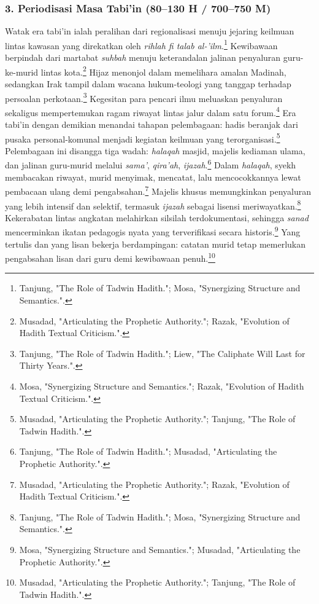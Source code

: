 \subsubsection*{3. Periodisasi Masa Tabi'in (80--130 H / 700--750 M)}

Watak era tabi'in ialah peralihan dari regionalisasi menuju jejaring keilmuan lintas kawasan yang direkatkan oleh \textit{rihlah fi talab al-'ilm}.\footnote{Tanjung, "The Role of Tadwin Hadith."; Mosa, "Synergizing Structure and Semantics.".} Kewibawaan berpindah dari martabat \textit{suhbah} menuju keterandalan jalinan penyaluran guru-ke-murid lintas kota.\footnote{Musadad, "Articulating the Prophetic Authority."; Razak, "Evolution of Hadith Textual Criticism.".} Hijaz menonjol dalam memelihara amalan Madinah, sedangkan Irak tampil dalam wacana hukum-teologi yang tanggap terhadap persoalan perkotaan.\footnote{Tanjung, "The Role of Tadwin Hadith."; Liew, "The Caliphate Will Last for Thirty Years.".} Kegesitan para pencari ilmu meluaskan penyaluran sekaligus mempertemukan ragam riwayat lintas jalur dalam satu forum.\footnote{Mosa, "Synergizing Structure and Semantics."; Razak, "Evolution of Hadith Textual Criticism.".} Era tabi'in dengan demikian menandai tahapan pelembagaan: hadis beranjak dari pusaka personal-komunal menjadi kegiatan keilmuan yang terorganisasi.\footnote{Musadad, "Articulating the Prophetic Authority."; Tanjung, "The Role of Tadwin Hadith.".} Pelembagaan ini disangga tiga wadah: \textit{halaqah} masjid, majelis kediaman ulama, dan jalinan guru-murid melalui \textit{sama'}, \textit{qira'ah}, \textit{ijazah}.\footnote{Tanjung, "The Role of Tadwin Hadith."; Musadad, "Articulating the Prophetic Authority.".} Dalam \textit{halaqah}, syekh membacakan riwayat, murid menyimak, mencatat, lalu mencocokkannya lewat pembacaan ulang demi pengabsahan.\footnote{Musadad, "Articulating the Prophetic Authority."; Razak, "Evolution of Hadith Textual Criticism.".} Majelis khusus memungkinkan penyaluran yang lebih intensif dan selektif, termasuk \textit{ijazah} sebagai lisensi meriwayatkan.\footnote{Tanjung, "The Role of Tadwin Hadith."; Mosa, "Synergizing Structure and Semantics.".} Kekerabatan lintas angkatan melahirkan silsilah terdokumentasi, sehingga \textit{sanad} mencerminkan ikatan pedagogis nyata yang terverifikasi secara historis.\footnote{Mosa, "Synergizing Structure and Semantics."; Musadad, "Articulating the Prophetic Authority.".} Yang tertulis dan yang lisan bekerja berdampingan: catatan murid tetap memerlukan pengabsahan lisan dari guru demi kewibawaan penuh.\footnote{Musadad, "Articulating the Prophetic Authority."; Tanjung, "The Role of Tadwin Hadith.".}

